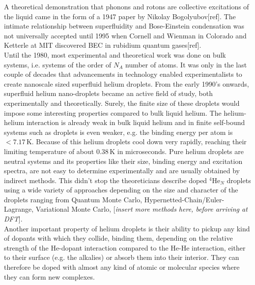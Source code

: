 \documentclass[11pt,a4paper,twoside]{article}
\newcommand{\unit}[1]{\,\mathrm{#1}}
\begin{document}
	A theoretical demonstration that phonons and rotons are collective excitations of the liquid came in the form of a 1947 paper by Nikolay Bogolyubov[ref]. The intimate relationship between superfluidity and Bose-Einstein condensation was not universally accepted until 1995 when Cornell and Wienman in Colorado and Ketterle at MIT discovered BEC in rubidium quantum gases[ref].\\
	
	Until the 1980, most experimental and theoretical work was done on bulk systems, i.e. systems of the order of $N_A$ number of atoms. It was only in the last couple of decades that advancements in technology enabled experimentalists to create nanoscale sized superfluid helium droplets. From the early 1990's onwards, superfluid helium nano-droplets became an active field of study, both experimentally and theoretically. Surely, the finite size of these droplets would impose some interesting properties compared to bulk liquid helium. The helium-helium interaction is already weak in bulk liquid helium and in finite self-bound systems such as droplets is even weaker, e.g. the binding energy per atom is $<\!7.17\unit{K}$. Because of this helium droplets cool down very rapidly, reaching their limiting temperature of about $0.38\unit{K}$ in microseconds. Pure helium droplets are neutral systems and its properties like their size, binding energy and excitation spectra, are not easy to determine experimentally and are usually obtained by indirect methods. This didn't stop the theoreticians describe doped $^4$He$_N$ droplets using a wide variety of approaches depending on the size and character of the droplets ranging from Quantum Monte Carlo, Hypernetted-Chain/Euler-Lagrange, Variational Monte Carlo, [\emph{insert more methods here, before arriving at DFT}].\\
	
	Another important property of helium droplets is their ability to pickup any kind of dopants with which they collide, binding them, depending on the relative strength of the He-dopant interaction compared to the He-He interaction, either to their surface (e.g. the alkalies) or absorb them into their interior. They can therefore be doped with almost any kind of atomic or molecular species where they can form new complexes.
	
\end{document}
